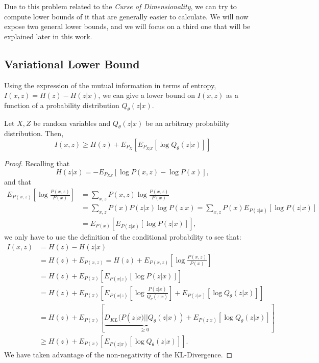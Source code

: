 Due to this problem related to the \emph{Curse of Dimensionality}, we can try to compute lower bounds of it that are generally easier to calculate. We will now expose two general lower bounds, and we will focus on a third one that will be explained later in this work.

\subsection*{Variational Lower Bound}



Using the expression of the mutual information in terms of entropy, $I(x,z) = H(z) - H(z|x)$, we can give a lower bound on $I(x,z)$ as a function of a probability distribution $Q_\theta(z|x)$. 

\begin{nprop}
Let $X,Z$ be random variables and $Q_\theta(z|x)$ be an arbitrary probability distribution. Then,
$$
I(x,z) \geq H(z) + E_{P_X} \left[ E_{P_{X|Z}}\left[\log Q_\theta(z|x)\right]\right] 
$$
\end{nprop}

\begin{proof}
Recalling that
$$
H(z|x) = - E_{P_{XZ}} \left[ \log P(x,z) - \log P(x)\right],
$$
and that
\begin{align*}
E_{P(x,z)}\left[\log\frac{P(x,z)}{P(x)}\right] & =  \sum_{x,z} P(x,z) \log\frac{P(x,z)}{P(x)} \\ 
& = \sum_{x,z} P(x)P(z|x) \log P(z|x) = \sum_{x,z} P(x) E_{P(z|x)}[\log P(z|x)]\\
 & =  E_{P(x)}\left[E_{P(z|x)}[\log P(z|x)]\right],
\end{align*}
we only have to use the definition of the conditional probability to see that:
\begin{align*}
I(x,z) & =  H(z) - H(z|x) \\
    & =  H(z) + E_{P(x,z)} = H(z) + E_{P(x,z)} \left[ \log \frac{P(x,z)}{P(x)}\right] \\
    & =  H(z) + E_{P(x)} \left[ E_{P(x|z)}\left[\log P(z|x)\right]\right] \\
    & = H(z) + E_{P(x)} \left[ E_{P(x|z)} \left[\log \frac{P(z|x)}{Q_\theta(z|x)}\right] + E_{P(z|x)}\left[\log Q_\theta(z|x)\right]\right] \\
    & =  H(z) + E_{P(x)}\left[ \underbrace{D_{KL}(P(z|x)||Q_\theta(z|x))}_{\geq 0} + E_{P(z|x)}\left[\log Q_\theta(z|x)\right] \right]\\
    & \geq H(z) + E_{P(x)}\left[E_{P(z|x)}\left[ \log Q_\theta(z|x)\right]\right].
\end{align*}
We have taken advantage of the non-negativity of the KL-Divergence.
\end{proof}

